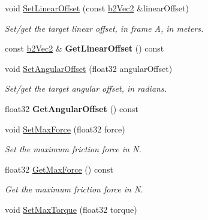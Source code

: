 \begin{DoxyCompactItemize}
void \hyperlink{classb2MotorJoint_a99254b5fc9ed9f2d0fdccada513000c3}{Set\+Linear\+Offset} (const \hyperlink{structb2Vec2}{b2\+Vec2} \&linear\+Offset)
\begin{DoxyCompactList}\small\item\em Set/get the target linear offset, in frame A, in meters. \end{DoxyCompactList}\item 
\mbox{\label{classb2MotorJoint_a87a61f162e202e2f3c12200e42e3b180}} 
const \hyperlink{structb2Vec2}{b2\+Vec2} \& {\bfseries Get\+Linear\+Offset} () const
\item 
\mbox{\label{classb2MotorJoint_a14d7dca1767548ddffe293e39cafc3c7}} 
void \hyperlink{classb2MotorJoint_a14d7dca1767548ddffe293e39cafc3c7}{Set\+Angular\+Offset} (float32 angular\+Offset)
\begin{DoxyCompactList}\small\item\em Set/get the target angular offset, in radians. \end{DoxyCompactList}\item 
\mbox{\label{classb2MotorJoint_a4dc4e5ee4ec8615c3d712ea6cac48436}} 
float32 {\bfseries Get\+Angular\+Offset} () const
\item 
\mbox{\label{classb2MotorJoint_a62f95f23d60123cebe14f2fcec155801}} 
void \hyperlink{classb2MotorJoint_a62f95f23d60123cebe14f2fcec155801}{Set\+Max\+Force} (float32 force)
\begin{DoxyCompactList}\small\item\em Set the maximum friction force in N. \end{DoxyCompactList}\item 
\mbox{\label{classb2MotorJoint_ac7353eace38d2593a523149abe8ec2b5}} 
float32 \hyperlink{classb2MotorJoint_ac7353eace38d2593a523149abe8ec2b5}{Get\+Max\+Force} () const
\begin{DoxyCompactList}\small\item\em Get the maximum friction force in N. \end{DoxyCompactList}\item 
\mbox{\label{classb2MotorJoint_a3e9a259d36c36e0dc078282e6799d625}} 
void \hyperlink{classb2MotorJoint_a3e9a259d36c36e0dc078282e6799d625}{Set\+Max\+Torque} (float32 torque)

\end{DoxyCompactItemize}
